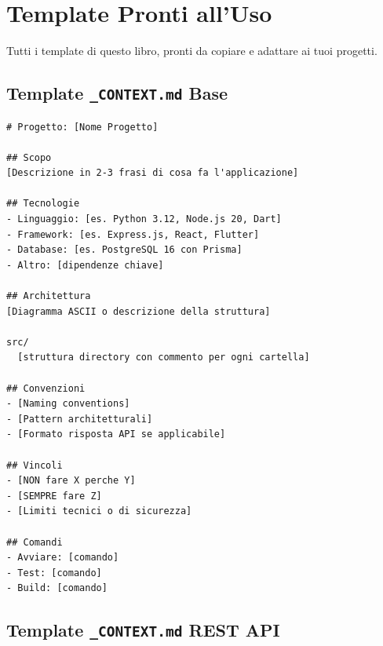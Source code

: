 \chapter{Template Pronti all'Uso}

Tutti i template di questo libro, pronti da copiare e adattare ai tuoi progetti.

\section{Template \texttt{\_CONTEXT.md} Base}

\begin{lstlisting}[language={},title={\_CONTEXT.md --- Template base}]
# Progetto: [Nome Progetto]

## Scopo
[Descrizione in 2-3 frasi di cosa fa l'applicazione]

## Tecnologie
- Linguaggio: [es. Python 3.12, Node.js 20, Dart]
- Framework: [es. Express.js, React, Flutter]
- Database: [es. PostgreSQL 16 con Prisma]
- Altro: [dipendenze chiave]

## Architettura
[Diagramma ASCII o descrizione della struttura]

src/
  [struttura directory con commento per ogni cartella]

## Convenzioni
- [Naming conventions]
- [Pattern architetturali]
- [Formato risposta API se applicabile]

## Vincoli
- [NON fare X perche Y]
- [SEMPRE fare Z]
- [Limiti tecnici o di sicurezza]

## Comandi
- Avviare: [comando]
- Test: [comando]
- Build: [comando]
\end{lstlisting}

\section{Template \texttt{\_CONTEXT.md} REST API}

